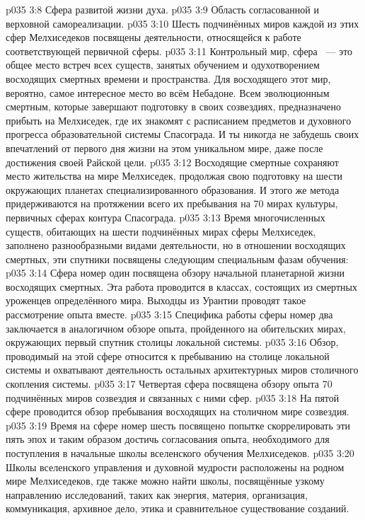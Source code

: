 \vs p035 3:8 Сфера развитой жизни духа.
\vs p035 3:9 Область согласованной и верховной самореализации.
\vs p035 3:10 \pc Шесть подчинённых миров каждой из этих сфер Мелхиседеков посвящены деятельности, относящейся к работе соответствующей первичной сферы.
\vs p035 3:11 \pc Контрольный мир, сфера ~--- это общее место встреч всех существ, занятых обучением и одухотворением восходящих смертных времени и пространства. Для восходящего этот мир, вероятно, самое интересное место во всём Небадоне. Всем эволюционным смертным, которые завершают подготовку в своих созвездиях, предназначено прибыть на Мелхиседек, где их знакомят с расписанием предметов и духовного прогресса образовательной системы Спасограда. И ты никогда не забудешь своих впечатлений от первого дня жизни на этом уникальном мире, даже после достижения своей Райской цели.
\vs p035 3:12 Восходящие смертные сохраняют место жительства на мире Мелхиседек, продолжая свою подготовку на шести окружающих планетах специализированного образования. И этого же метода придерживаются на протяжении всего их пребывания на 70 мирах культуры, первичных сферах контура Спасограда.
\vs p035 3:13 \pc Время многочисленных существ, обитающих на шести подчинённых мирах сферы Мелхиседек, заполнено разнообразными видами деятельности, но в отношении восходящих смертных, эти спутники посвящены следующим специальным фазам обучения:
\vs p035 3:14 Сфера номер один посвящена обзору начальной планетарной жизни восходящих смертных. Эта работа проводится в классах, состоящих из смертных уроженцев определённого мира. Выходцы из Урантии проводят такое рассмотрение опыта вместе.
\vs p035 3:15 Специфика работы сферы номер два заключается в аналогичном обзоре опыта, пройденного на обительских мирах, окружающих первый спутник столицы локальной системы.
\vs p035 3:16 Обзор, проводимый на этой сфере относится к пребыванию на столице локальной системы и охватывают деятельность остальных архитектурных миров столичного скопления системы.
\vs p035 3:17 Четвертая сфера посвящена обзору опыта 70 подчинённых миров созвездия и связанных с ними сфер.
\vs p035 3:18 На пятой сфере проводится обзор пребывания восходящих на столичном мире созвездия.
\vs p035 3:19 Время на сфере номер шесть посвящено попытке скоррелировать эти пять эпох и таким образом достичь согласования опыта, необходимого для поступления в начальные школы вселенского обучения Мелхиседеков.
\vs p035 3:20 \pc Школы вселенского управления и духовной мудрости расположены на родном мире Мелхиседеков, где также можно найти школы, посвящённые узкому направлению исследований, таких как энергия, материя, организация, коммуникация, архивное дело, этика и сравнительное существование созданий.
